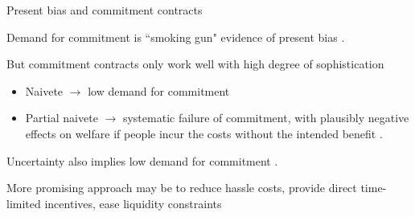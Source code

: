 \documentclass[aspectratio=169, 10pt, handout]{beamer}
\newenvironment{wideitemize}{\itemize\addtolength{\itemsep}{10pt}}{\enditemize}
\begin{document}
\begin{frame}{Present bias and commitment contracts}

\begin{wideitemize}

	\item Demand for commitment is ``smoking gun" evidence of present bias \citep{ashraf2006tying,gine2010put,kaur2015self,schilbach2015alcohol,casaburi2018demand}.
	
	\item But commitment contracts only work well with high degree of sophistication
	
	\begin{itemize}
	
		\item Naivete $\rightarrow$ low demand for commitment
		
		\item Partial naivete $\rightarrow$ systematic failure of commitment, with plausibly negative effects on welfare if people incur the costs without the intended benefit \citep{john2016commitment,bai2017self}.
		
	\end{itemize}
	
	\item Uncertainty also implies low demand for commitment \citep{laibson2015don,Amador2006}.
	
	\item More promising approach may be to reduce hassle costs, provide direct time-limited incentives, ease liquidity constraints


\end{wideitemize}

\end{frame}
\end{document}
